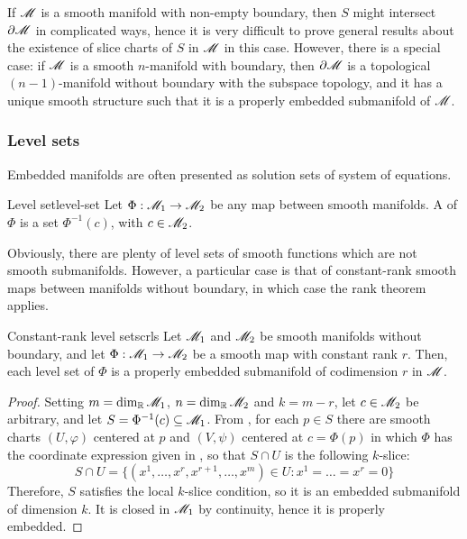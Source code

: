 If $ \mathscr{M} $ is a smooth manifold with non-empty boundary, then $ S $ might intersect $ \partial \mathscr{M} $ in complicated ways, hence it is very difficult to prove general results about the existence of slice charts of $ S $ in $ \mathscr{M} $ in this case. However, there is a special case: if $ \mathscr{M} $ is a smooth $ n $-manifold with boundary, then $ \partial \mathscr{M} $ is a topological $ (n-1) $-manifold without boundary with the subspace topology, and it has a unique smooth structure such that it is a properly embedded submanifold of $ \mathscr{M} $.

\subsubsection{Level sets}
\label{sssec:level-sets}

Embedded manifolds are often presented as solution sets of system of equations.

\begin{definition}{Level set}{level-set}
  Let $ \Phi : \mathscr{M}_1 \rightarrow \mathscr{M}_2 $ be any map between smooth manifolds. A  of $ \Phi $ is a set $ \Phi^{-1}(c) $, with $ c \in \mathscr{M}_2 $.
\end{definition}

Obviously, there are plenty of level sets of smooth functions which are not smooth submanifolds. However, a particular case is that of constant-rank smooth maps between manifolds without boundary, in which case the rank theorem applies.

\begin{proposition}{Constant-rank level sets}{crls}
  Let $ \mathscr{M}_1 $ and $ \mathscr{M}_2 $ be smooth manifolds without boundary, and let $ \Phi : \mathscr{M}_1 \rightarrow \mathscr{M}_2 $ be a smooth map with constant rank $ r $. Then, each level set of $ \Phi $ is a properly embedded submanifold of codimension $ r $ in $ \mathscr{M} $.
\end{proposition}

\begin{proofbox}
  \begin{proof}
    Setting $ m = \dim_{\mathbb{R}} \mathscr{M}_1 $, $ n = \dim_{\mathbb{R}} \mathscr{M}_2 $ and $ k = m - r $, let $ c \in \mathscr{M}_2 $ be arbitrary, and let $ S = \Phi^{-1}(c) \subseteq \mathscr{M}_1 $. From , for each $ p \in S $ there are smooth charts $ (U,\varphi) $ centered at $ p $ and $ (V,\psi) $ centered at $ c = \Phi(p) $ in which $ \Phi $ has the coordinate expression given in , so that $ S \cap U $ is the following $ k $-slice:
    \begin{equation*}
      S \cap U = \{(x^1 , \dots , x^r , x^{r+1} , \dots , x^m) \in U : x^1 = \dots = x^r = 0\}
    \end{equation*}
    Therefore, $ S $ satisfies the local $ k $-slice condition, so it is an embedded submanifold of dimension $ k $. It is closed in $ \mathscr{M}_1 $ by continuity, hence it is properly embedded.
  \end{proof}
\end{proofbox}

